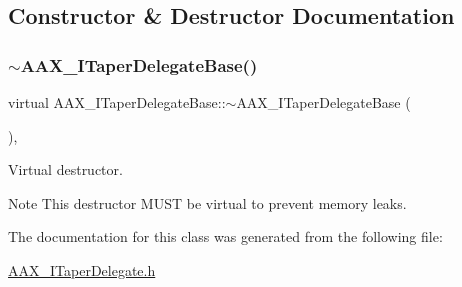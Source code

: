 \subsection{Constructor \& Destructor Documentation}
\mbox{\label{a01877_a38bf3326334b9bc248c62faff2492d38}} 
\subsubsection{\texorpdfstring{$\sim$AAX\_ITaperDelegateBase()}{~AAX\_ITaperDelegateBase()}}
{\footnotesize\ttfamily virtual A\+A\+X\+\_\+\+I\+Taper\+Delegate\+Base\+::$\sim$\+A\+A\+X\+\_\+\+I\+Taper\+Delegate\+Base (\begin{DoxyParamCaption}{ }\end{DoxyParamCaption})\hspace{0.3cm}{\ttfamily [inline]}, {\ttfamily [virtual]}}



Virtual destructor. 

\begin{DoxyNote}{Note}
This destructor M\+U\+ST be virtual to prevent memory leaks. 
\end{DoxyNote}


The documentation for this class was generated from the following file\+:\begin{DoxyCompactItemize}
\item 
\mbox{\hyperlink{a00638}{A\+A\+X\+\_\+\+I\+Taper\+Delegate.\+h}}\end{DoxyCompactItemize}

